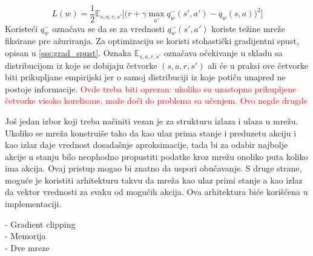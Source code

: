 \begin{equation}
	L(w) = \frac{1}{2}\mathbb{E}_{s,a,r,s'}\bigg[ \big(r + \gamma \max_{a'}q_w^-(s',a') - q_w(s,a)\big) ^2 \bigg]
\end{equation}
Koristeći $q_w^-$ označava se da se za vrednosti $q_w^-(s',a')$ koriste težine mreže fiksirane pre ažuriranja. Za optimizaciju se koristi stohastički gradijentni spust, opisan u \ref{sss:grad_spust}. Oznaka $\mathbb{E}_{s,a,r,s'}$ označava očekivanje u skladu sa distribucijom iz koje se dobijaju četvorke $(s,a,r,s')$ ali će u praksi ove četvorke biti prikupljane empirijski jer o samoj distribuciji iz koje potiču unapred ne postoje informacije. \textcolor{red}{Ovde treba biti oprezan: ukoliko su uzastopno prikupljene četvorke visoko korelisane, može doći do problema sa učenjem. Ovo negde drugde}
\par 
Još jedan izbor koji treba načiniti vezan je za strukturu izlaza i ulaza u mrežu. Ukoliko se mreža konstruiše tako da kao ulaz prima stanje i preduzetu akciju i kao izlaz daje vrednost dosadašnje aproksimacije, tada bi za odabir najbolje akcije u stanju bilo neophodno propustiti podatke kroz mrežu onoliko puta koliko ima akcija. Ovaj pristup mogao bi znatno da uspori obučavanje. S druge strane, moguće je koristiti arhitekturu takvu da mreža kao ulaz primi stanje a kao izlaz da vektor vrednosti za svaku od mogućih akcija. Ova arhitektura biće korišćena u implementaciji.
\par 
- Gradient clipping \\
- Memorija\\
- Dve mreze\\

